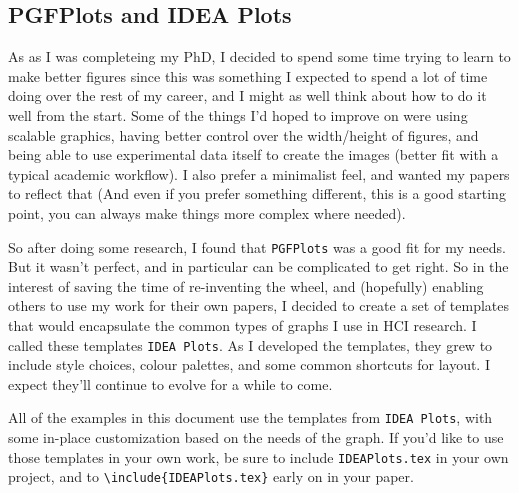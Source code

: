 \subsection{PGFPlots and IDEA Plots}
As as I was completeing my PhD, I decided to spend some time trying to learn to make better figures since this was something I expected to spend a lot of time doing over the rest of my career, and I might as well think about how to do it well from the start. Some of the things I'd hoped to improve on were using scalable graphics, having better control over the width/height of figures, and being able to use experimental data itself to create the images (better fit with a typical academic workflow). I also prefer a minimalist feel, and wanted my papers to reflect that (And even if you prefer something different, this is a good starting point, you can always make things more complex where needed). 

So after doing some research, I found that \texttt{PGFPlots} was a good fit for my needs. But it wasn't perfect, and in particular can be complicated to get right. So in the interest of saving the time of re-inventing the wheel, and (hopefully) enabling others to use my work for their own papers, I decided to create a set of templates that would encapsulate the common types of graphs I use in HCI research. I called these templates \texttt{IDEA Plots}. As I developed the templates, they grew to include style choices, colour palettes, and some common shortcuts for layout. I expect they'll continue to evolve for a while to come.  

All of the examples in this document use the templates from \texttt{IDEA Plots}, with some in-place customization based on the needs of the graph. If you'd like to use those templates in your own work, be sure to include \texttt{IDEAPlots.tex} in your own project, and to \texttt{\textbackslash include\{IDEAPlots.tex\}} early on in your paper.  